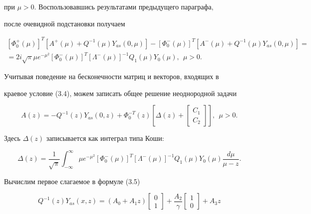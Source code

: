 \begin{pf}
при $\mu>0$. Воспользовавшись результатами предыдущего параграфа, 


после очевидной подстановки получаем 


\begin{multline} 


[\Phi^+_0(\mu)]^T[A^+(\mu)+Q^{-1}(\mu)Y_{as}(0,\mu)]- 


[\Phi^-_0(\mu)]^T[A^-(\mu)+Q^{-1}(\mu)Y_{as}(0,\mu)]= \\ 


% 


=2i\sqrt{\pi}\mu e^{-\mu^2}[\Phi^-_0(\mu)]^T 


[\Lambda^-(\mu)]^{-1}Q_1(\mu)Y_0(\mu),\ \ \mu>0. 


\end{multline} 


Учитывая поведение на бесконечности матриц и векторов, входящих в 


краевое условие (3.4), можем записать общее решение неоднородной задачи 


\begin{equation} 


A(z)=-Q^{-1}(z)Y_{as}(0,z)+\Phi^{-T}_0(z)\left[\Delta(z)+ 


\begin{bmatrix} C_1 \\ C_2 \end{bmatrix}\right],\ \ \mu>0. 


\end{equation} 


Здесь $\Delta(z)$ записывается как интеграл типа Коши: 


$$ 


\Delta(z)=\frac{1}{\sqrt{\pi}}\int^\infty_{-\infty} 


\mu e^{-\mu^2}[\Phi^-_0(\mu)]^T 


[\Lambda^-(\mu)]^{-1}Q_1(\mu)Y_0(\mu)\frac{d\mu}{\mu-z}. 


$$ 


Вычислим первое слагаемое в формуле (3.5)


\begin{equation} 


Q^{-1}(z)Y_{as}(x,z)=(A_0+A_1z) 


\begin{bmatrix} 0 \\ 1 \end{bmatrix} +\frac{A_2}{\gamma} 


\begin{bmatrix} 1 \\ 0 \end{bmatrix}+A_3z 



\end{equation}
\end{pf}
